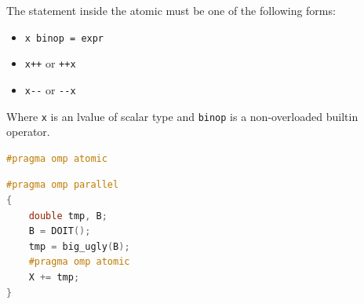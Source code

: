 \highspace
The statement inside the atomic must be one of the following forms:
\begin{itemize}
    \item \texttt{x binop = expr}
    \item \texttt{x++} or \texttt{++x}
    \item \texttt{x-}\texttt{-} or \texttt{-}\texttt{-x}
\end{itemize}
Where \texttt{x} is an lvalue of scalar type and \texttt{binop} is a non-overloaded builtin operator.

\begin{openmpbox}
    \begin{lstlisting}[language=C++]
#pragma omp atomic\end{lstlisting}
\end{openmpbox}

\begin{examplebox}
    \begin{lstlisting}[language=C++]
#pragma omp parallel
{
    double tmp, B;
    B = DOIT();
    tmp = big_ugly(B);
    #pragma omp atomic
    X += tmp;
}
    \end{lstlisting}
\end{examplebox}